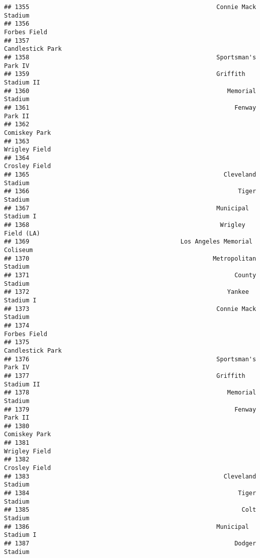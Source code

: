 \documentclass[]{article}
\begin{document}
\begin{verbatim}
## 1355                                                    Connie Mack Stadium
## 1356                                                           Forbes Field
## 1357                                                       Candlestick Park
## 1358                                                    Sportsman's Park IV
## 1359                                                    Griffith Stadium II
## 1360                                                       Memorial Stadium
## 1361                                                         Fenway Park II
## 1362                                                          Comiskey Park
## 1363                                                          Wrigley Field
## 1364                                                          Crosley Field
## 1365                                                      Cleveland Stadium
## 1366                                                          Tiger Stadium
## 1367                                                    Municipal Stadium I
## 1368                                                     Wrigley Field (LA)
## 1369                                          Los Angeles Memorial Coliseum
## 1370                                                   Metropolitan Stadium
## 1371                                                         County Stadium
## 1372                                                       Yankee Stadium I
## 1373                                                    Connie Mack Stadium
## 1374                                                           Forbes Field
## 1375                                                       Candlestick Park
## 1376                                                    Sportsman's Park IV
## 1377                                                    Griffith Stadium II
## 1378                                                       Memorial Stadium
## 1379                                                         Fenway Park II
## 1380                                                          Comiskey Park
## 1381                                                          Wrigley Field
## 1382                                                          Crosley Field
## 1383                                                      Cleveland Stadium
## 1384                                                          Tiger Stadium
## 1385                                                           Colt Stadium
## 1386                                                    Municipal Stadium I
## 1387                                                         Dodger Stadium

\end{verbatim}
\end{document}

